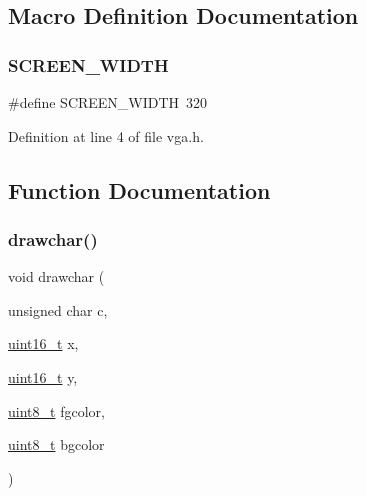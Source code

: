 \subsection{Macro Definition Documentation}
\mbox{\label{a00038_a2cd109632a6dcccaa80b43561b1ab700_a2cd109632a6dcccaa80b43561b1ab700}} 
\subsubsection{\texorpdfstring{S\+C\+R\+E\+E\+N\+\_\+\+W\+I\+D\+TH}{SCREEN\_WIDTH}}
{\footnotesize\ttfamily \#define S\+C\+R\+E\+E\+N\+\_\+\+W\+I\+D\+TH~320}



Definition at line 4 of file vga.\+h.



\subsection{Function Documentation}
\mbox{\label{a00038_a2c8df7a20b47341b70d97a7ff21d86ea_a2c8df7a20b47341b70d97a7ff21d86ea}} 
\subsubsection{\texorpdfstring{drawchar()}{drawchar()}}
{\footnotesize\ttfamily void drawchar (\begin{DoxyParamCaption}\item[{unsigned char}]{c,  }\item[{\hyperlink{a00104_a273cf69d639a59973b6019625df33e30_a273cf69d639a59973b6019625df33e30}{uint16\+\_\+t}}]{x,  }\item[{\hyperlink{a00104_a273cf69d639a59973b6019625df33e30_a273cf69d639a59973b6019625df33e30}{uint16\+\_\+t}}]{y,  }\item[{\hyperlink{a00104_aba7bc1797add20fe3efdf37ced1182c5_aba7bc1797add20fe3efdf37ced1182c5}{uint8\+\_\+t}}]{fgcolor,  }\item[{\hyperlink{a00104_aba7bc1797add20fe3efdf37ced1182c5_aba7bc1797add20fe3efdf37ced1182c5}{uint8\+\_\+t}}]{bgcolor }\end{DoxyParamCaption})}



